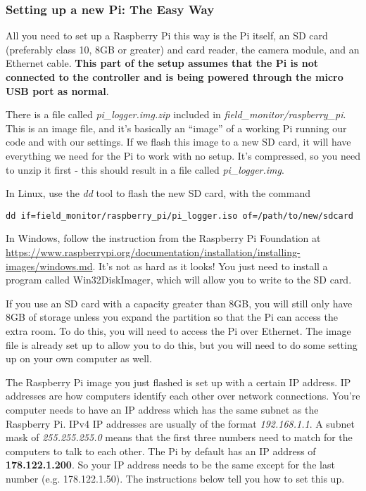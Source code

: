 \documentclass[10pt]{article}
\begin{document}
\subsubsection{Setting up a new Pi: The Easy Way}
All you need to set up a Raspberry Pi this way is the Pi itself, an SD card (preferably class 10, 8GB or greater) and card reader, the camera module, and an Ethernet cable. \textbf{This part of the setup assumes that the Pi is not connected to the controller and is being powered through the micro USB port as normal}.

There is a file called \textit{pi\_logger.img.zip} included in \textit{field\_monitor/raspberry\_pi}. This is an image file, and it's basically an ``image'' of a working Pi running our code and with our settings. If we flash this image to a new SD card, it will have everything we need for the Pi to work with no setup. It's compressed, so you need to unzip it first - this should result in a file called \textit{pi\_logger.img}.

In Linux, use the \textit{dd} tool to flash the new SD card, with the command
\begin{verbatim}
dd if=field_monitor/raspberry_pi/pi_logger.iso of=/path/to/new/sdcard
\end{verbatim}

In Windows, follow the instruction from the Raspberry Pi Foundation at \url{https://www.raspberrypi.org/documentation/installation/installing-images/windows.md}. It's
not as hard as it looks! You just need to install a program called Win32DiskImager, which will allow you to write to the SD card.

If you use an SD card with a capacity greater than 8GB, you will still only have 8GB of storage unless you expand the partition so that the Pi can
access the extra room. To do this, you will need to access the Pi over Ethernet. The image file is already set up to allow you to do this, but you will need to
do some setting up on your own computer as well. 

The Raspberry Pi image you just flashed is set up with a certain IP address. IP addresses are how computers identify each other over network connections. You're computer needs to have an IP address which has the same subnet as the Raspberry Pi. IPv4 IP addresses are usually of the format \textit{192.168.1.1}. A subnet mask of \textit{255.255.255.0} means that the first three numbers need to match for the computers to talk to each other. The Pi by default has an IP address of \textbf{178.122.1.200}. So your IP address needs to be the same except for the last number (e.g. 178.122.1.50). The instructions below tell you how to set this up. \newline
\end{document}
